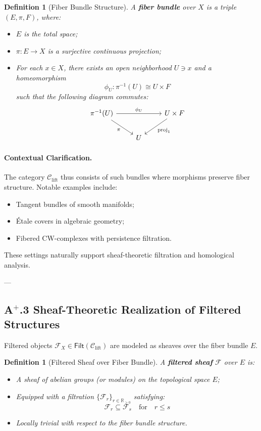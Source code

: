 \documentclass[11pt]{article}
\newtheorem{definition}[theorem]{Definition}
\begin{document}
\begin{definition}[Fiber Bundle Structure]
A \textbf{fiber bundle} over \( X \) is a triple \( (E, \pi, F) \), where:
\begin{itemize}
    \item \( E \) is the total space;
    \item \( \pi : E \rightarrow X \) is a surjective continuous projection;
    \item For each \( x \in X \), there exists an open neighborhood \( U \ni x \) and a homeomorphism
    \[
    \phi_U : \pi^{-1}(U) \cong U \times F
    \]
    such that the following diagram commutes:
    \[
    \begin{tikzcd}
    \pi^{-1}(U) \arrow[rr, "\phi_U"] \arrow[dr, "\pi"']
    & & U \times F \arrow[dl, "\mathrm{proj}_1"] \\
    & U &
    \end{tikzcd}
    \]
\end{itemize}
\end{definition}

\paragraph{Contextual Clarification.}
The category \( \mathcal{C}_{\mathrm{lift}} \) thus consists of such bundles where morphisms preserve fiber structure. Notable examples include:
\begin{itemize}
  \item Tangent bundles of smooth manifolds;
  \item Étale covers in algebraic geometry;
  \item Fibered CW-complexes with persistence filtration.
\end{itemize}
These settings naturally support sheaf-theoretic filtration and homological analysis.

---

\subsection*{A$^{+}$.3 Sheaf-Theoretic Realization of Filtered Structures}

Filtered objects $\mathcal{F}_X \in \mathsf{Filt}(\mathcal{C}_{\mathrm{lift}})$ are modeled as sheaves over the fiber bundle $E$.

\begin{definition}[Filtered Sheaf over Fiber Bundle]
A \textbf{filtered sheaf} $\mathcal{F}$ over $E$ is:

\begin{itemize}
    \item A sheaf of abelian groups (or modules) on the topological space $E$;
    \item Equipped with a filtration $\{ \mathcal{F}_r \}_{r \in \mathbb{R}_{\geq 0}}$ satisfying:
    \[
    \mathcal{F}_r \subseteq \mathcal{F}_s \quad \text{for} \quad r \leq s
    \]
    \item Locally trivial with respect to the fiber bundle structure.
\end{itemize}
\end{definition}
\end{document}
